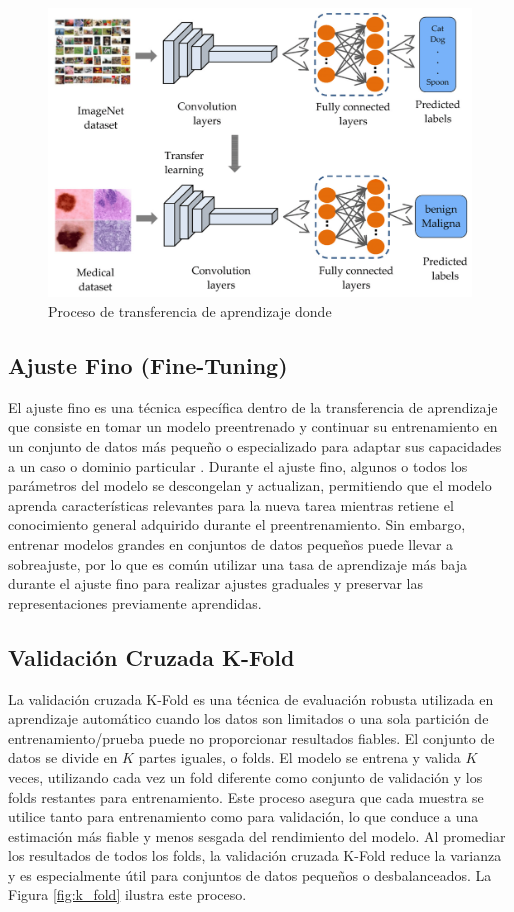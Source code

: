 \documentclass[a4paper,10pt]{book}
\begin{document}
\begin{figure}[h!]
\centering
\includegraphics[width=0.75\linewidth]{reports//assets/transfer-learning.png}
\caption[Transfer learning process]{Proceso de transferencia de aprendizaje donde}
\label{fig:transfer_learning}
\end{figure}

\subsection{Ajuste Fino (Fine-Tuning)}

El ajuste fino es una técnica específica dentro de la transferencia de aprendizaje que consiste en tomar un modelo preentrenado y continuar su entrenamiento en un conjunto de datos más pequeño o especializado para adaptar sus capacidades a un caso o dominio particular \cite{noauthor_what_2024}. Durante el ajuste fino, algunos o todos los parámetros del modelo se descongelan y actualizan, permitiendo que el modelo aprenda características relevantes para la nueva tarea mientras retiene el conocimiento general adquirido durante el preentrenamiento. Sin embargo, entrenar modelos grandes en conjuntos de datos pequeños puede llevar a sobreajuste, por lo que es común utilizar una tasa de aprendizaje más baja durante el ajuste fino para realizar ajustes graduales y preservar las representaciones previamente aprendidas.

\subsection{Validación Cruzada K-Fold}

La validación cruzada K-Fold es una técnica de evaluación robusta utilizada en aprendizaje automático cuando los datos son limitados o una sola partición de entrenamiento/prueba puede no proporcionar resultados fiables. El conjunto de datos se divide en $K$ partes iguales, o folds. El modelo se entrena y valida $K$ veces, utilizando cada vez un fold diferente como conjunto de validación y los folds restantes para entrenamiento. Este proceso asegura que cada muestra se utilice tanto para entrenamiento como para validación, lo que conduce a una estimación más fiable y menos sesgada del rendimiento del modelo. Al promediar los resultados de todos los folds, la validación cruzada K-Fold reduce la varianza y es especialmente útil para conjuntos de datos pequeños o desbalanceados. La Figura \ref{fig:k_fold} ilustra este proceso.
\end{document}
